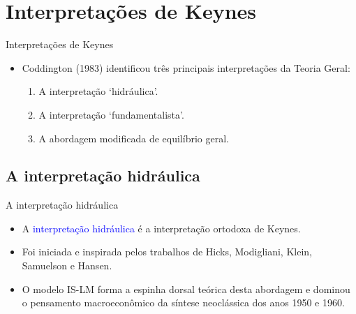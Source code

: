 \documentclass[10pt]{beamer}
\begin{document}
\section{Interpretações de Keynes}
\begin{frame}{Interpretações de Keynes}
    \begin{itemize}
        \item Coddington (1983) identificou três principais interpretações da Teoria Geral:
        \bigskip
        \begin{enumerate}
            \item A interpretação `hidráulica'.
            \bigskip
            \item A interpretação `fundamentalista'.
            \bigskip
            \item A abordagem modificada de equilíbrio geral.
        \end{enumerate}
    \end{itemize}
\end{frame}

\subsection{A interpretação hidráulica}
\begin{frame}{A interpretação hidráulica}
    \begin{itemize}
        \item A \textcolor{blue}{interpretação hidráulica} é a interpretação ortodoxa de Keynes.
        \bigskip
        \item Foi iniciada e inspirada pelos trabalhos de Hicks, Modigliani, Klein, Samuelson e Hansen.
        \bigskip
        \item O modelo IS-LM forma a espinha dorsal teórica desta abordagem e dominou o pensamento macroeconômico da síntese neoclássica dos anos 1950 e 1960.
    \end{itemize}
\end{frame}
\end{document}
